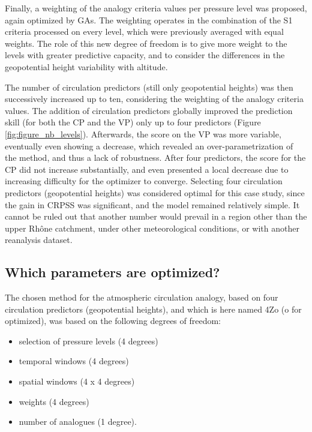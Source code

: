 \documentclass[review]{elsarticle}
\begin{document}
Finally, a weighting of the analogy criteria values per pressure level was proposed, again optimized by GAs. The weighting operates in the combination of the S1 criteria processed on every level, which were previously averaged with equal weights. The role of this new degree of freedom is to give more weight to the levels with greater predictive capacity, and to consider the differences in the geopotential height variability with altitude. 

The number of circulation predictors (still only geopotential heights) was then successively increased up to ten, considering the weighting of the analogy criteria values. The addition of circulation predictors globally improved the prediction skill (for both the CP and the VP) only up to four predictors (Figure \ref{fig:figure_nb_levels}). Afterwards, the score on the VP was more variable, eventually even showing a decrease, which revealed an over-parametrization of the method, and thus a lack of robustness. After four predictors, the score for the CP did not increase substantially, and even presented a local decrease due to increasing difficulty for the optimizer to converge. Selecting four circulation predictors (geopotential heights) was considered optimal for this case study, since the gain in CRPSS was significant, and the model remained relatively simple. It cannot be ruled out that another number would prevail in a region other than the upper Rh\^{o}ne catchment, under other meteorological conditions, or with another reanalysis dataset.

\subsection{Which parameters are optimized?}

The chosen method for the atmospheric circulation analogy, based on four circulation predictors (geopotential heights), and which is here named 4Zo (o for optimized), was based on the following degrees of freedom:

\begin{itemize}
	\setlength\itemsep{-4px}
	\item selection of pressure levels (4 degrees)
	\item temporal windows (4 degrees)
	\item spatial windows (4 x 4 degrees)
	\item weights (4 degrees)
	\item number of analogues (1 degree).
\end{itemize}
\end{document}
